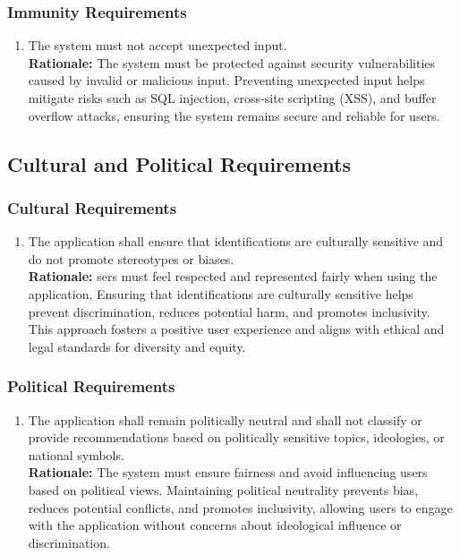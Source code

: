 \documentclass[]{article}
\begin{document}
\subsubsection{Immunity Requirements}
\label{ssub:immunity_requirements}
\begin{enumerate}[{SR-IM}1. ]
	\item The system must not accept unexpected input.
	\\ \textbf{Rationale:} The system must be protected against security vulnerabilities caused by invalid or malicious input. Preventing unexpected input helps mitigate risks such as SQL injection, cross-site scripting (XSS), and buffer overflow attacks, ensuring the system remains secure and reliable for users.
\end{enumerate}


\subsection{Cultural and Political Requirements}
\label{sub:cultural_and_political_requirements}

\subsubsection{Cultural Requirements}
\label{ssub:cultural_requirements}
\begin{enumerate}[{CP-C}1. ]
	\item The application shall ensure that identifications are culturally sensitive and do not promote stereotypes or biases.
	\\ \textbf{Rationale:} sers must feel respected and represented fairly when using the application. Ensuring that identifications are culturally sensitive helps prevent discrimination, reduces potential harm, and promotes inclusivity. This approach fosters a positive user experience and aligns with ethical and legal standards for diversity and equity.
\end{enumerate}

\subsubsection{Political Requirements}
\label{ssub:political_requirements}
\begin{enumerate}[{CP-P}1. ]
	\item The application shall remain politically neutral and shall not classify or provide recommendations based on politically sensitive topics, ideologies, or national symbols.
	\\ \textbf{Rationale:} The system must ensure fairness and avoid influencing users based on political views. Maintaining political neutrality prevents bias, reduces potential conflicts, and promotes inclusivity, allowing users to engage with the application without concerns about ideological influence or discrimination.
\end{enumerate}
\end{document}
